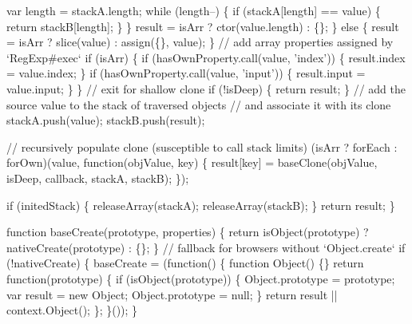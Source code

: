 \begin{DoxyCodeInclude}
        var length = stackA.length;
        \textcolor{keywordflow}{while} (length--) \{
          \textcolor{keywordflow}{if} (stackA[length] == value) \{
            \textcolor{keywordflow}{return} stackB[length];
          \}
        \}
        result = isArr ? ctor(value.length) : \{\};
      \}
      \textcolor{keywordflow}{else} \{
        result = isArr ? slice(value) : assign(\{\}, value);
      \}
      \textcolor{comment}{// add array properties assigned by `RegExp#exec`}
      \textcolor{keywordflow}{if} (isArr) \{
        \textcolor{keywordflow}{if} (hasOwnProperty.call(value, \textcolor{stringliteral}{'index'})) \{
          result.index = value.index;
        \}
        \textcolor{keywordflow}{if} (hasOwnProperty.call(value, \textcolor{stringliteral}{'input'})) \{
          result.input = value.input;
        \}
      \}
      \textcolor{comment}{// exit for shallow clone}
      \textcolor{keywordflow}{if} (!isDeep) \{
        \textcolor{keywordflow}{return} result;
      \}
      \textcolor{comment}{// add the source value to the stack of traversed objects}
      \textcolor{comment}{// and associate it with its clone}
      stackA.push(value);
      stackB.push(result);

      \textcolor{comment}{// recursively populate clone (susceptible to call stack limits)}
      (isArr ? forEach : forOwn)(value, \textcolor{keyword}{function}(objValue, key) \{
        result[key] = baseClone(objValue, isDeep, callback, stackA, stackB);
      \});

      \textcolor{keywordflow}{if} (initedStack) \{
        releaseArray(stackA);
        releaseArray(stackB);
      \}
      \textcolor{keywordflow}{return} result;
    \}

    \textcolor{keyword}{function} baseCreate(prototype, properties) \{
      \textcolor{keywordflow}{return} isObject(prototype) ? nativeCreate(prototype) : \{\};
    \}
    \textcolor{comment}{// fallback for browsers without `Object.create`}
    \textcolor{keywordflow}{if} (!nativeCreate) \{
      baseCreate = (\textcolor{keyword}{function}() \{
        \textcolor{keyword}{function} Object() \{\}
        \textcolor{keywordflow}{return} \textcolor{keyword}{function}(prototype) \{
          \textcolor{keywordflow}{if} (isObject(prototype)) \{
            Object.prototype = prototype;
            var result = \textcolor{keyword}{new} Object;
            Object.prototype = null;
          \}
          \textcolor{keywordflow}{return} result || context.Object();
        \};
      \}());
    \}


\end{DoxyCodeInclude}
